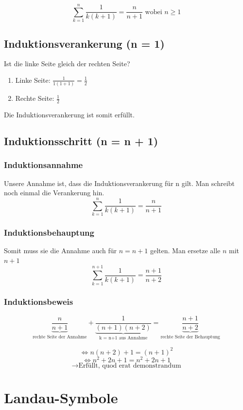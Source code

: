 \[
\sum\limits_{k=1}^{n} \frac{1}{k(k+1)} = \frac{n}{n + 1} \text{ wobei } n \geq 1
\]

\subsection{Induktionsverankerung (n = 1)}
Ist die linke Seite gleich der rechten Seite?
\begin{enumerate}
	\item Linke Seite: $\frac{1}{1(1+1)} = \frac{1}{2}$
	
	\item Rechte Seite: $\frac{1}{2}$
\end{enumerate}
Die Induktionsverankerung ist somit erfüllt.

\subsection{Induktionsschritt (n = n + 1)}
\subsubsection{Induktionsannahme}
Unsere Annahme ist, dass die Induktionsverankerung für n gilt. Man schreibt noch einmal die Verankerung hin.
\[
\sum\limits_{k=1}^{n} \frac{1}{k(k+1)} = \frac{n}{n + 1}
\]

\subsubsection{Induktionsbehauptung}
Somit muss sie die Annahme auch für $n = n + 1$ gelten. Man ersetze alle $n$ mit $n + 1$
\[
\sum\limits_{k=1}^{n + 1} \frac{1}{k(k+1)} = \frac{n + 1}{n + 2}
\]

\subsubsection{Induktionsbeweis}
\[
\underbrace{\frac{n}{n + 1}}_{\text{rechte Seite der Annahme}} + \underbrace{\frac{1}{(n+1)(n+2)}}_{\text{k = n+1 aus Annahme}} = \underbrace{\frac{n+1}{n+2}}_{\text{rechte Seite der Behauptung}}
\]

\[ \Leftrightarrow n(n+2) + 1 = (n+1)^2 \]
\[ \Leftrightarrow n^2 + 2n + 1 = n^2 + 2n +1 \]
\[ \rightarrow \text{Erfüllt, quod erat demonstrandum} \]


\section{Landau-Symbole}
